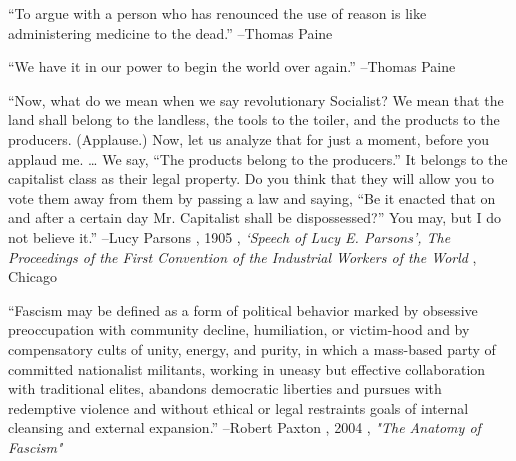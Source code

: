 \documentclass{article}%
\begin{document}
\linebreak%
\vspace{1mm}%
\begin{minipage}{\textwidth}%
\flushleft%
“To argue with a person who has renounced the use of reason is like administering medicine to the dead.”%
\linebreak%
\vspace{1mm}%
–Thomas Paine%
\linebreak%
\vspace{1mm}%
\end{minipage}%
\linebreak%
\vspace{1mm}%
\begin{minipage}{\textwidth}%
\flushleft%
“We have it in our power to begin the world over again.”%
\linebreak%
\vspace{1mm}%
–Thomas Paine%
\linebreak%
\vspace{1mm}%
\end{minipage}%
\linebreak%
\vspace{1mm}%
\begin{minipage}{\textwidth}%
\flushleft%
“Now, what do we mean when we say revolutionary Socialist? We mean that the land shall belong to the landless, the tools to the toiler, and the products to the producers. (Applause.) Now, let us analyze that for just a moment, before you applaud me. … We say, “The products belong to the producers.” It belongs to the capitalist class as their legal property. Do you think that they will allow you to vote them away from them by passing a law and saying, “Be it enacted that on and after a certain day Mr. Capitalist shall be dispossessed?” You may, but I do not believe it.”%
\linebreak%
\vspace{1mm}%
–Lucy Parsons%
, 1905%
, \textit{‘Speech of Lucy E. Parsons’, The Proceedings of the First Convention of the Industrial Workers of the World}%
, Chicago%
\linebreak%
\vspace{1mm}%
\end{minipage}%
\linebreak%
\vspace{1mm}%
\begin{minipage}{\textwidth}%
\flushleft%
“Fascism may be defined as a form of political behavior marked by obsessive preoccupation with community decline, humiliation, or victim{-}hood and by compensatory cults of unity, energy, and purity, in which a mass{-}based party of committed nationalist militants, working in uneasy but effective collaboration with traditional elites, abandons democratic liberties and pursues with redemptive violence and without ethical or legal restraints goals of internal cleansing and external expansion.”%
\linebreak%
\vspace{1mm}%
–Robert Paxton%
, 2004%
, \textit{"The Anatomy of Fascism"}%
\linebreak%
\vspace{1mm}%
\end{minipage}%
\end{document}
